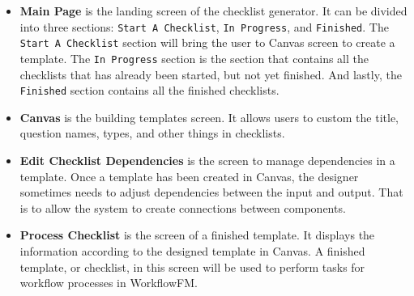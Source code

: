 \begin{itemize}
    \item \textbf{Main Page} is the landing screen of the checklist generator. It can be divided into three sections: \verb!Start A Checklist!, \verb!In Progress!, and \verb!Finished!. The \verb!Start A Checklist! section will bring the user to Canvas screen to create a template. The \verb!In Progress! section is the section that contains all the checklists that has already been started, but not yet finished. And lastly, the \verb!Finished! section contains all the finished checklists.
    \item \textbf{Canvas} is the building templates screen. It allows users to custom the title, question names, types, and other things in checklists.
    \item \textbf{Edit Checklist Dependencies} is the screen to manage dependencies in a template. Once a template has been created in Canvas, the designer sometimes needs to adjust dependencies between the input and output. That is to allow the system to create connections between components.
    \item \textbf{Process Checklist} is the screen of a finished template. It displays the information according to the designed template in Canvas. A finished template, or checklist, in this screen will be used to perform tasks for workflow processes in WorkflowFM.
\end{itemize}

